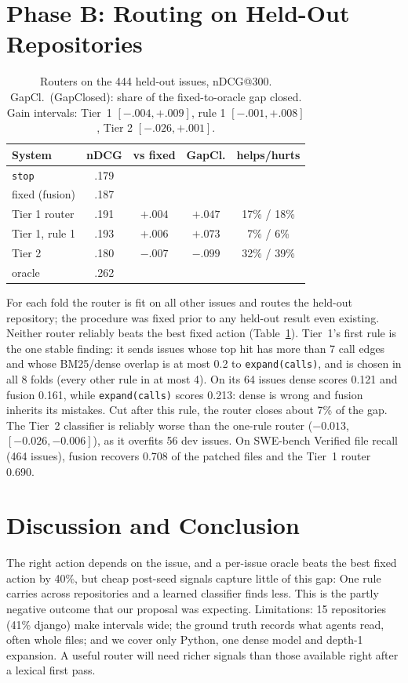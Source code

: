 \documentclass[11pt]{article}
\newcommand{\action}[1]{\texttt{#1}}
\begin{document}
\section{Phase B: Routing on Held-Out Repositories}

\begin{table}[t]
\centering
\small
\setlength{\tabcolsep}{3pt}
\begin{tabular}{@{}lcccc@{}}
\toprule
System & nDCG & vs fixed & GapCl. & helps/hurts \\
\midrule
\action{stop} & .179 & & & \\
fixed (fusion) & .187 & & & \\
Tier 1 router & .191 & $+.004$ & $+.047$ & 17\% / 18\% \\
Tier 1, rule 1 & .193 & $+.006$ & $+.073$ & 7\% / 6\% \\
Tier 2 & .180 & $-.007$ & $-.099$ & 32\% / 39\% \\
oracle & .262 & & & \\
\bottomrule
\end{tabular}
\caption{Routers on the 444 held-out issues, nDCG@300. GapCl.\ (GapClosed):
share of the fixed-to-oracle gap closed. Gain intervals: Tier~1
$[-.004, +.009]$, rule 1 $[-.001, +.008]$, Tier 2 $[-.026, +.001]$.}
\label{tab:heldout}
\end{table}

For each fold the router is fit on all other issues and routes the held-out
repository; the procedure was fixed prior to any held-out result even existing.
Neither router reliably beats the best fixed action
(Table~\ref{tab:heldout}). Tier~1's first rule is the one stable finding: it
sends issues whose top hit has more than 7 call edges and whose BM25/dense
overlap is at most 0.2 to \action{expand(calls)}, and is chosen in all 8
folds (every other rule in at most 4). On its 64 issues dense scores 0.121
and fusion 0.161, while \action{expand(calls)} scores 0.213: dense is wrong
and fusion inherits its mistakes. Cut after this rule, the router closes
about 7\% of the gap. The Tier~2 classifier is reliably worse than the
one-rule router ($-0.013$, $[-0.026, -0.006]$), as it overfits 56 dev
issues. On SWE-bench Verified file recall (464 issues), fusion recovers 0.708
of the patched files and the Tier~1 router 0.690.

\section{Discussion and Conclusion}

The right action depends on the issue, and a per-issue oracle beats the best
fixed action by 40\%, but cheap post-seed signals capture little of this gap:
One rule carries across repositories and a learned classifier finds less.
This is the partly negative outcome that our proposal was expecting. Limitations:
15 repositories (41\% django) make intervals wide; the ground truth records
what agents read, often whole files; and we cover only Python, one dense
model and depth-1 expansion. A useful router will need richer signals than
those available right after a lexical first pass.


\end{document}
